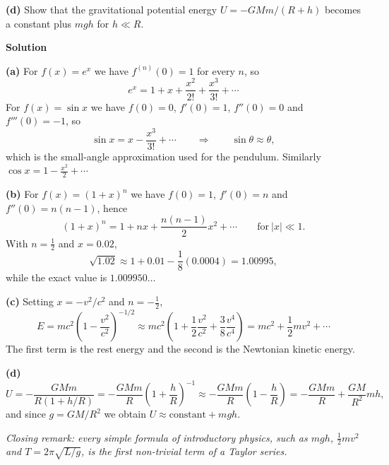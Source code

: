 \documentclass[12pt]{article}
\begin{document}
\textbf{(d)} Show that the gravitational potential energy $U = -GMm/(R+h)$ becomes a constant plus $mgh$ for $h \ll R$.

\bigskip
\textbf{Solution}

\textbf{(a)} For $f(x) = e^x$ we have $f^{(n)}(0) = 1$ for every $n$, so
\[
e^x = 1 + x + \frac{x^2}{2!} + \frac{x^3}{3!} + \cdots
\]
For $f(x) = \sin x$ we have $f(0) = 0$, $f'(0) = 1$, $f''(0) = 0$ and $f'''(0) = -1$, so
\[
\sin x = x - \frac{x^3}{3!} + \cdots
\qquad \Longrightarrow \qquad
\sin\theta \approx \theta ,
\]
which is the small-angle approximation used for the pendulum. Similarly $\cos x = 1 - \frac{x^2}{2} + \cdots$

\textbf{(b)} For $f(x) = (1+x)^n$ we have $f(0) = 1$, $f'(0) = n$ and $f''(0) = n(n-1)$, hence
\[
(1+x)^n = 1+nx+\frac{n(n-1)}{2}x^2+\cdots
\qquad \text{for} \ |x|\ll 1 .
\]
With $n = \frac{1}{2}$ and $x = 0.02$,
\[
\sqrt{1.02} \approx 1 + 0.01 - \frac{1}{8}(0.0004) = 1.00995 ,
\]
while the exact value is $1.009950\ldots$

\textbf{(c)} Setting $x = -v^2/c^2$ and $n = -\frac{1}{2}$,
\[
E = mc^2\left(1-\frac{v^2}{c^2}\right)^{-1/2}
\approx mc^2\left(1+\frac{1}{2}\frac{v^2}{c^2}+\frac{3}{8}\frac{v^4}{c^4}\right)
= mc^2 + \frac{1}{2}mv^2 + \cdots
\]
The first term is the rest energy and the second is the Newtonian kinetic energy.

\textbf{(d)}
\[
U = -\frac{GMm}{R\left(1+h/R\right)}
= -\frac{GMm}{R}\left(1+\frac{h}{R}\right)^{-1}
\approx -\frac{GMm}{R}\left(1-\frac{h}{R}\right)
= -\frac{GMm}{R} + \frac{GM}{R^2}mh ,
\]
and since $g = GM/R^2$ we obtain $U \approx \text{constant} + mgh$.

\bigskip
\noindent \emph{Closing remark: every simple formula of introductory physics, such as $mgh$, $\frac{1}{2}mv^2$ and $T = 2\pi\sqrt{L/g}$, is the first non-trivial term of a Taylor series.}
\end{document}

